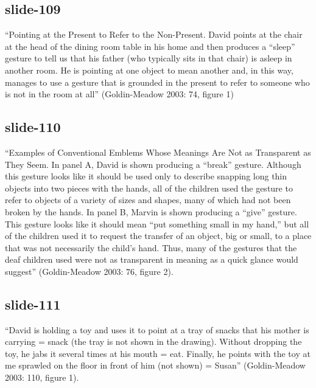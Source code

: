 \documentclass[12pt,\papersize]{extarticle}
\begin{document}
 
\subsection{slide-109}
“Pointing at the Present to Refer to the Non-Present. David points at the chair at the head of the dining room table in his home and then produces a “sleep” gesture to tell us that his father (who typically sits in that chair) is asleep in another room. He is pointing at one object to mean another and, in this way, manages to use a gesture that is grounded in the present to refer to someone who is not in the room at all” (Goldin-Meadow 2003: 74, figure 1)
 
 
\subsection{slide-110}
“Examples of Conventional Emblems Whose Meanings Are Not as Transparent as They Seem. In panel A, David is shown producing a “break” gesture. Although this gesture looks like it should be used only to describe snapping long thin objects into two pieces with the hands, all of the children used the gesture to refer to objects of a variety of sizes and shapes, many of which had not been broken by the hands. In panel B, Marvin is shown producing a “give” gesture. This gesture looks like it should mean “put something small in my hand,” but all of the children used it to request the transfer of an object, big or small, to a place that was not necessarily the child's hand. Thus, many of the gestures that the deaf children used were not as transparent in meaning as a quick glance would suggest” (Goldin-Meadow 2003: 76, figure 2).
 
 
\subsection{slide-111}
“David is holding a toy and uses it to point at a tray of snacks that his mother is carrying = snack (the tray is not shown in the drawing). Without dropping the toy, he jabs it several times at his mouth = eat. Finally, he points with the toy at me sprawled on the floor in front of him (not shown) = Susan” (Goldin-Meadow 2003: 110, figure 1).
 
 
\end{document}
